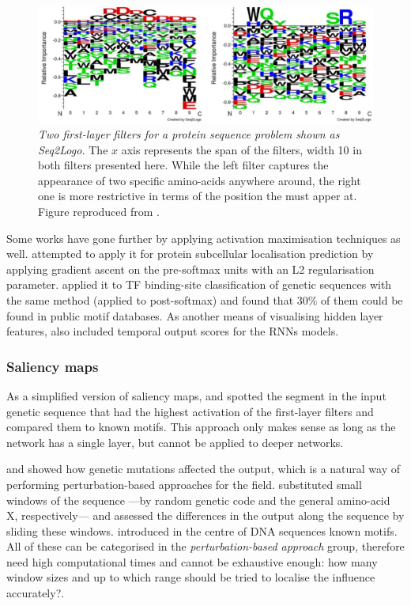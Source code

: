 \begin{figure}
	\centering
	\includegraphics[width=0.7\linewidth]{Figures/seqlogo}
	\caption{\textit{Two first-layer filters for a protein sequence problem shown as Seq2Logo.} The $x$ axis represents the span of the filters, width 10 in both filters presented here. While the left filter captures the appearance of two specific amino-acids anywhere around, the right one is more restrictive in terms of the position the must apper at. Figure reproduced from \cite{Fontal2017}.}
	\label{fig:seqlogo}
\end{figure}

Some works have gone further by applying activation maximisation techniques as well. \cite{Fontal2017} attempted to apply it for protein subcellular localisation prediction by applying gradient ascent on the pre-softmax units with an L2 regularisation parameter. \cite{Lanchantin2016} applied it to TF binding-site classification of genetic sequences with the same method (applied to post-softmax) and found that 30\% of them could be found in public motif databases. As another means of visualising hidden layer features, \cite{Lanchantin2016} also included temporal output scores for the RNNs models.

\subsubsection*{Saliency maps}
As a simplified version of saliency maps, \cite{Alipanahi2015} and \cite{Quang2016} spotted the segment in the input genetic sequence that had the highest activation of the first-layer filters and compared them to known motifs. This approach only makes sense as long as the network has a single layer, but cannot be applied to deeper networks.

\cite{Alipanahi2015} and \cite{Zhou2015} showed how genetic mutations affected the output, which is a natural way of performing perturbation-based approaches for the field. \cite{Umarov2017,Fontal2017} substituted small windows of the sequence ---by random genetic code and the general amino-acid X, respectively--- and assessed the differences in the output along the sequence by sliding these windows. \cite{Kelley2016} introduced in the centre of DNA sequences known motifs. All of these can be categorised in the \textit{perturbation-based approach} group, therefore need high computational times and cannot be exhaustive enough: how many window sizes and up to which range should be tried to localise the influence accurately?.

